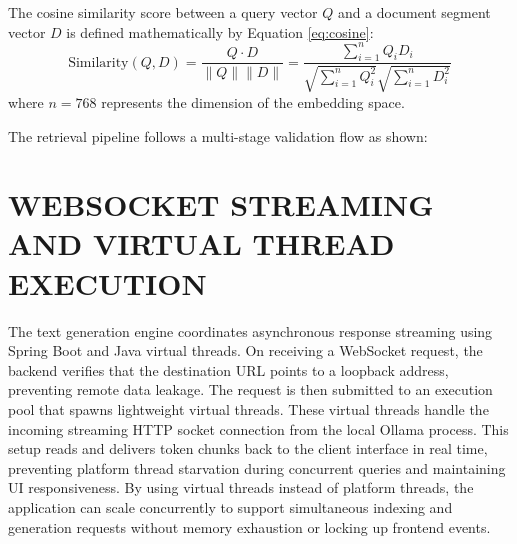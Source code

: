 \documentclass[12pt,a4paper]{report}
\begin{document}
The cosine similarity score between a query vector $Q$ and a document segment vector $D$ is defined mathematically by Equation \ref{eq:cosine}:
\begin{equation}
\label{eq:cosine}
\text{Similarity}(Q, D) = \frac{Q \cdot D}{\|Q\| \|D\|} = \frac{\sum_{i=1}^{n} Q_i D_i}{\sqrt{\sum_{i=1}^{n} Q_i^2} \sqrt{\sum_{i=1}^{n} D_i^2}}
\end{equation}
where $n = 768$ represents the dimension of the embedding space.

The retrieval pipeline follows a multi-stage validation flow as shown:
\begin{center}
\end{center}

\section{WEBSOCKET STREAMING AND VIRTUAL THREAD EXECUTION}
The text generation engine coordinates asynchronous response streaming using Spring Boot and Java virtual threads. On receiving a WebSocket request, the backend verifies that the destination URL points to a loopback address, preventing remote data leakage. The request is then submitted to an execution pool that spawns lightweight virtual threads. These virtual threads handle the incoming streaming HTTP socket connection from the local Ollama process. This setup reads and delivers token chunks back to the client interface in real time, preventing platform thread starvation during concurrent queries and maintaining UI responsiveness. By using virtual threads instead of platform threads, the application can scale concurrently to support simultaneous indexing and generation requests without memory exhaustion or locking up frontend events.
\end{document}
